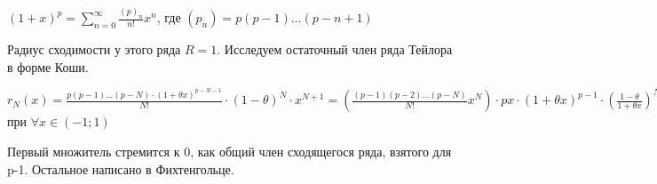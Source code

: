 \documentclass[a4paper, fleqn]{article}
\begin{document}
    $(1 + x)^p = \sum_{n=0}^\infty \frac{(p)_n}{n!} x^n$, где $(p_n) = p(p-1) \dots (p-n+1)$

    Радиус сходимости у этого ряда $R = 1$. Исследуем остаточный член ряда Тейлора в форме Коши.

    $r_N(x) = \frac{p(p-1)\dots(p-N) \cdot (1 + \theta x)^{p - N - 1}}{N!} \cdot (1 - \theta)^N \cdot 
    x^{N+1} = \left(\frac{(p-1) (p-2) \dots (p - N)}{N!} x^N \right) \cdot px \cdot (1 + \theta x)^{p - 1}
    \cdot \left(\frac{1 - \theta}{1 + \theta x}\right)^N \xrightarrow[]{N \to \infty} 0$ при 
    $\forall x \in (-1; 1)$

    Первый множитель стремится к 0, как общий член сходящегося ряда, взятого для p-1.
    Остальное написано в Фихтенгольце.
        
\end{document}
